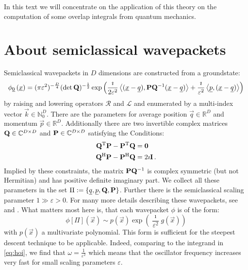 \documentclass[a4paper,10pt]{article}
\begin{document}
In this text we will concentrate on the application of this theory on
the computation of some overlap integrals from quantum mechanics.


\section{About semiclassical wavepackets}


Semiclassical wavepackets in $D$ dimensions are constructed from a groundstate:
\begin{align*}
  \phi_{\underline{0}}\left(\underline{x}\right)
  =
  (\pi\varepsilon^2)^{-\frac{D}{4}} (\det\mathbf{Q})^{-\frac{1}{2}}
  \exp \left( \frac{\imath}{2\varepsilon^2}
  \left\langle (\underline{x}-\underline{q}) , \mathbf{P}\mathbf{Q}{}^{-1}(\underline{x}-\underline{q}) \right\rangle
  + \frac{\imath}{\varepsilon^2} \left\langle \underline{p} , (\underline{x}-\underline{q}) \right\rangle
  \right)
\end{align*}
by raising and lowering operators $\mathcal{R}$ and $\mathcal{L}$
and enumerated by a multi-index vector $\vec{k} \in \mathbb{N}_0^D$.
There are the parameters for average position $\vec{q} \in \mathbb{R}^D$
and momentum $\vec{p} \in \mathbb{R}^D$. Additionally there are two invertible
complex matrices $\mathbf{Q} \in \mathbb{C}^{D \times D}$ and $\mathbf{P} \in \mathbb{C}^{D \times D}$
satisfying the Conditions:
\begin{align}
  \mathbf{Q}{}^{\textnormal{T}}\mathbf{P} - \mathbf{P}{}^{\textnormal{T}}\mathbf{Q} &= \mathbf{0} \\
  \mathbf{Q}{}^{\textnormal{H}}\mathbf{P} - \mathbf{P}{}^{\textnormal{H}}\mathbf{Q} &= 2\imath\mathbf{I} \,.
\end{align}
Implied by these constraints, the matrix $\mathbf{P}\mathbf{Q}{}^{-1}$ is complex symmetric
(but not Hermitian) and has positive definite imaginary part.
We collect all these parameters in the set $\Pi := \{\underline{q}, \underline{p}, \mathbf{Q}, \mathbf{P}\}$.
Further there is the semiclassical scaling parameter $1 \gg \varepsilon > 0$.
For many more details describing these wavepackets, see \cite{H_ladder_operators}
and \cite{B_master_thesis}.
What matters most here is, that each wavepacket $\phi$ is of the form:
\begin{equation}
  \phi[\Pi](\vec{x}) \sim p\left(\vec{x}\right)
                          \exp\left(\frac{\imath}{\varepsilon^2} g\left(\vec{x}\right)\right)
\end{equation}
with $p(\vec{x})$ a multivariate polynomial.
This form is sufficient for the steepest descent technique to be applicable.
Indeed, comparing to the integrand in \eqref{eq:hoi},
we find that $\omega = \frac{1}{\varepsilon^2}$ which means that the oscillator
frequency increases very fast for small scaling parameters $\varepsilon$.
\end{document}
